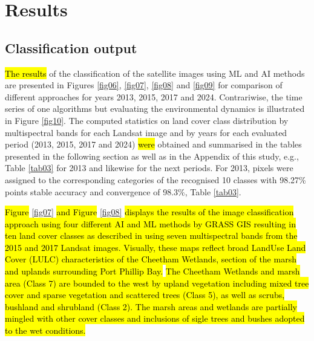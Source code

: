 \documentclass[jmse,article,submit,pdftex,moreauthors]{Definitions/mdpi}
\begin{document}
\section{Results}

\subsection{Classification output}

\hl{The results} of the classification of the satellite images using ML and AI methods are presented in Figures \ref{fig06}, \ref{fig07}, \ref{fig08} and \ref{fig09} for comparison of different approaches for years 2013, 2015, 2017 and 2024. Contrariwise, the time series of one algorithms but evaluating the environmental dynamics is illustrated in Figure \ref{fig10}. The computed statistics on land cover class distribution by multispectral bands for each Landsat image and by years for each evaluated period (2013, 2015, 2017 and 2024) \hl{were} obtained and summarised in the tables presented in the following section as well as in the Appendix of this study, e.g., Table \ref{tab03} for 2013 and likewise for the next periods. For 2013, pixels were assigned to the corresponding categories of the recognised 10 classes with 98.27\% points stable accuracy and convergence of 98.3\%, Table \ref{tab03}.

\hl{Figure} \ref{fig07} \hl{and Figure} \ref{fig08} \hl{displays the results of the image classification approach using four different AI and ML methods by GRASS GIS resulting in ten land cover classes as described in using seven multispectral bands from the 2015 and 2017 Landsat images. Visually, these maps reflect broad LandUse Land Cover (LULC) characteristics of the Cheetham Wetlands, section of the marsh and uplands surrounding Port Phillip Bay.} \hl{The Cheetham Wetlands and marsh area (Class 7) are bounded to the west by upland vegetation including mixed tree cover and sparse vegetation and scattered trees (Class 5), as well as scrubs, bushland and shrubland (Class 2). The marsh areas and wetlands are partially mingled with other cover classes and inclusions of sigle trees and bushes adopted to the wet conditions. }
\end{document}
